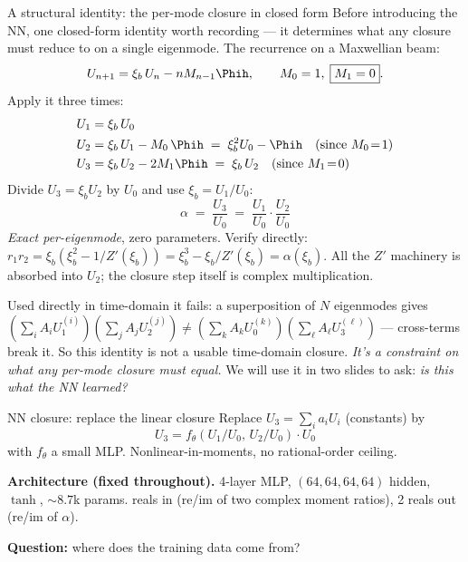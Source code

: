 \documentclass[10pt, aspectratio=169]{beamer}
\newcommand{\xib}{\xi_b}
\begin{document}
\begin{frame}{A structural identity: the per-mode closure in closed form}
  \footnotesize
  Before introducing the NN, one closed-form identity worth recording ---
  it determines what any closure must reduce to on a single eigenmode.
  The recurrence on a Maxwellian beam:
  \[
    U_{n+1} = \xib\, U_n - n M_{n-1}\Phih,
    \qquad M_0 = 1,\; \boxed{M_1 = 0}.
  \]
  Apply it three times:
  \begin{align*}
    U_1 &= \xib\, U_0\\
    U_2 &= \xib\, U_1 - M_0\,\Phih \;=\; \xib^2 U_0 - \Phih \quad\text{(since } M_0\!=\!1\text{)}\\
    U_3 &= \xib\, U_2 - 2 M_1 \Phih \;=\; \xib\, U_2 \quad \text{(since } M_1\!=\!0\text{)}
  \end{align*}
  Divide $U_3 = \xib U_2$ by $U_0$ and use $\xib = U_1/U_0$:
  \[
    \boxed{\;\alpha \;=\; \frac{U_3}{U_0} \;=\; \frac{U_1}{U_0}\cdot\frac{U_2}{U_0}\;}
  \]
  \emph{Exact per-eigenmode}, zero parameters. Verify directly:
  $r_1 r_2 = \xib(\xib^2 - 1/Z'(\xib)) = \xib^3 - \xib/Z'(\xib) = \alpha(\xib)$.
  All the $Z'$ machinery is absorbed into $U_2$; the closure step itself is
  complex multiplication.

  \vspace{0.4em}
  Used directly in time-domain it fails: a superposition of $N$
  eigenmodes gives $(\sum_i A_i U_1^{(i)})(\sum_j A_j U_2^{(j)}) \neq
  (\sum_k A_k U_0^{(k)})(\sum_\ell A_\ell U_3^{(\ell)})$ --- cross-terms
  break it. So this identity is not a usable time-domain closure.
  \emph{It's a constraint on what any per-mode closure must equal.}
  We will use it in two slides to ask: \emph{is this what the NN learned?}
\end{frame}

\begin{frame}{NN closure: replace the linear closure}
  Replace $U_3 = \sum_i a_i U_i$ (constants) by
  \[
    \boxed{\;U_3 = f_\theta(U_1/U_0,\, U_2/U_0) \cdot U_0\;}
  \]
  with $f_\theta$ a small MLP. Nonlinear-in-moments, no rational-order
  ceiling.

  \vspace{1em}
  \textbf{Architecture (fixed throughout).}
  4-layer MLP, $(64,64,64,64)$ hidden, $\tanh$, $\sim\!8.7$k params. reals in (re/im of two complex moment ratios), 2 reals out (re/im of
  $\alpha$).

  \vspace{0.8em}
  \textbf{Question:} where does the training data come from?
\end{frame}
\end{document}
